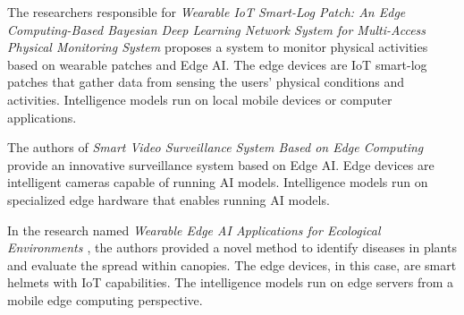 
The researchers responsible for \textit{Wearable IoT Smart-Log Patch: An Edge Computing-Based Bayesian Deep Learning Network System for Multi-Access Physical Monitoring System \cite{manogaran2019wearable}} proposes a system to monitor physical activities based on wearable patches and Edge AI. The edge devices are IoT smart-log patches that gather data from sensing the users' physical conditions and activities. Intelligence models run on local mobile devices or computer applications.



The authors of \textit{Smart Video Surveillance System Based on Edge Computing \cite{cob2021smart}} provide an innovative surveillance system based on Edge AI. Edge devices are intelligent cameras capable of running AI models. Intelligence models run on specialized edge hardware that enables running AI models.



In the research named \textit{Wearable Edge AI Applications for Ecological Environments \cite{silva2021wearable}}, the authors provided a novel method to identify diseases in plants and evaluate the spread within canopies. The edge devices, in this case, are smart helmets with IoT capabilities. The intelligence models run on edge servers from a mobile edge computing perspective.


